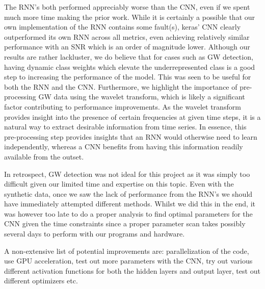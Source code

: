 \documentclass[%
reprint,
amsmath,amssymb,
aps,
]{revtex4-2}
\begin{document}
The RNN's both performed appreciably worse than the CNN, even if we spent much more time making the prior work. While it is certainly a possible that our own implementation of the RNN contains some fault(s), keras' CNN clearly outperformed its own RNN across all metrics, even achieving relatively similar performance with an SNR which is an order of magnitude lower. Although our results are rather lackluster, we do believe that for cases such as GW detection, having dynamic class weights which elevate the underrepresented class is a good step to increasing the performance of the model. This was seen to be useful for both the RNN and the CNN. Furthermore, we highlight the importance of pre-processing GW data using the wavelet transform, which is likely a significant factor contributing to performance improvements. As the wavelet transform provides insight into the presence of certain frequencies at given time steps, it is a natural way to extract desirable information from time series. In essence, this pre-processing step provides insights that an RNN would otherwise need to learn independently, whereas a CNN benefits from having this information readily available from the outset.

In retrospect, GW detection was not ideal for this project as it was simply too difficult given our limited time and expertise on this topic. Even with the synthetic data, once we saw the lack of performance from the RNN's we should have immediately attempted different methods. Whilst we did this in the end, it was however too late to do a proper analysis to find optimal parameters for the CNN given the time constraints since a proper parameter scan takes possibly several days to perform with our programs and hardware.

A non-extensive list of potential improvements are: parallelization of the code, use GPU acceleration, test out more parameters with the CNN, try out various different activation functions for both the hidden layers and output layer, test out different optimizers etc.




 
\appendix

\end{document}
